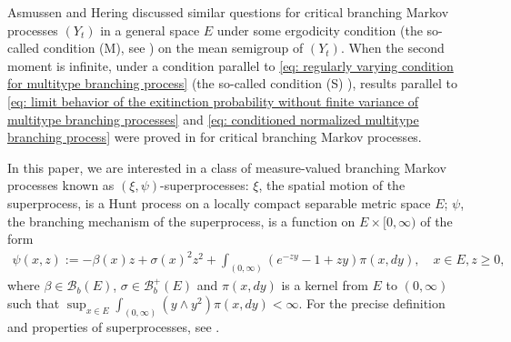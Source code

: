 \documentclass[12pt,a4paper]{amsart}
\theoremstyle{definition}
\numberwithin{equation}{section}
\begin{document}
Asmussen and Hering \cite[Sections~6.3~and~6.4]{AsmussenHering1983Branching} discussed similar questions for critical branching Markov processes $(Y_t)$ in a general space $E$ under some ergodicity condition (the so-called condition (M), see \cite[p.~156]{AsmussenHering1983Branching}) on the mean semigroup of $(Y_t)$.
When the second moment is infinite, under a condition  parallel  to \eqref{eq: regularly varying condition for multitype branching process} (the so-called condition (S) \cite[p.~207]{AsmussenHering1983Branching}), results parallel to \eqref{eq: limit behavior of the exitinction probability without finite variance of multitype branching processes} and \eqref{eq: conditioned normalized multitype branching process} were proved in \cite[Theorem~6.4.2]{AsmussenHering1983Branching} for critical branching Markov processes.

In this paper, we are interested in a class of measure-valued branching Markov processes known as $(\xi, \psi)$-superprocesses:
$\xi$, the spatial motion of the superprocess, is a Hunt process on a locally compact separable metric space $E$;
$\psi$, the branching mechanism of the superprocess, is a function on $E \times [0,\infty)$ of the form
\begin{align} 
\label{eq: branching mechanism}
	\psi(x,z):=
	- \beta(x) z + \sigma (x)^2 z^2 + \int_{(0,\infty)} (e^{-zy} - 1 + zy) \pi(x,dy),
	\quad x\in E, z\geq 0,
\end{align}
where $\beta\in \mathscr B_b(E)$, $\sigma\in \mathscr B_b^+(E)$ 
and $\pi(x,dy)$ is a kernel from $E$ to $(0,\infty)$ such that $\sup_{x\in E} \int_{(0,\infty)} (y\wedge y^2) \pi(x,dy) < \infty$.
For the precise definition and properties of superprocesses, see \cite{Li2011Measure-valued}.
\end{document}

